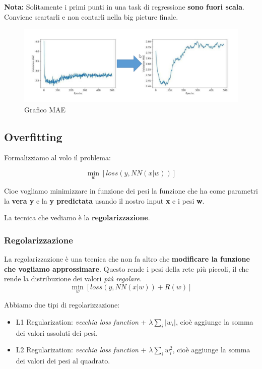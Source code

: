 \textbf{Nota:} Solitamente i primi punti in una task di regressione \textbf{sono fuori scala}. Conviene scartarli e non 
contarli nella big picture finale.

\begin{figure}[H]
    \centering
    \includegraphics[scale=0.5]{images/mae.png}
    \caption{Grafico MAE}
    \label{fig:mae}
\end{figure}

\subsection{Overfitting}
\label{subsec:overfitting}

Formalizziamo al volo il problema:

\begin{equation}
    \min_{w} [loss(y,NN(x|w))]
\end{equation}

Cioe vogliamo minimizzare in funzione dei pesi la funzione che ha come parametri la \textbf{vera y} e 
la \textbf{y predictata} usando il nostro input \textbf{x} e i pesi \textbf{w}.

La tecnica che vediamo è la \textbf{regolarizzazione}.

\subsubsection{Regolarizzazione}

La regolarizzazione è una tecnica che non fa altro che \textbf{modificare la funzione che vogliamo approssimare}.
Questo rende i pesi della rete più piccoli, il che rende la distribuzione dei valori \textit{più regolare.}
\begin{equation}
    \min_{w} [loss(y,NN(x|w)) + R(w)]
\end{equation}

Abbiamo due tipi di regolarizzazione:
\begin{itemize}
    \item L1 Regularization: \textit{vecchia loss function} + $\lambda \sum_i|w_i|$, cioè aggiunge la somma dei valori assoluti dei pesi.
    \item L2 Regularization: \textit{vecchia loss function} + $\lambda \sum_i w_i^2$, cioè aggiunge la somma dei valori dei pesi al quadrato.
\end{itemize}


